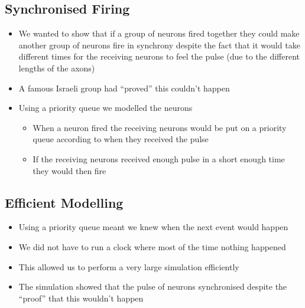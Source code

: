 
\begin{slide}
\section{Synchronised Firing}

\begin{PauseHighLight}
  \begin{itemize}
  \item We wanted to show that if a group of neurons fired together they
    could make another group of neurons fire in synchrony despite the
    fact that it would take different times for the receiving neurons to
    feel the pulse (due to the different lengths of the axons)\pause
  \item A famous Israeli group had ``proved'' this couldn't happen\pause
  \item Using a priority queue we modelled the neurons
    \begin{itemize}
    \item When a neuron fired the receiving neurons would be put on a
      priority queue according to when they received the pulse\pause
    \item If the receiving neurons received enough pulse in a short
      enough time they would then fire\pause
    \end{itemize}
  \end{itemize}
\end{PauseHighLight}

\end{slide}


\begin{slide}
\section{Efficient Modelling}

\begin{PauseHighLight}
  \begin{itemize}
  \item Using a priority queue meant we knew when the next event would
    happen\pause
  \item We did not have to run a clock where most of the time nothing
    happened\pause
  \item This allowed us to perform a very large simulation efficiently\pause
  \item The simulation showed that the pulse of neurons synchronised
    despite the ``proof'' that this wouldn't happen\pause
  \end{itemize}
\end{PauseHighLight}

\end{slide}


